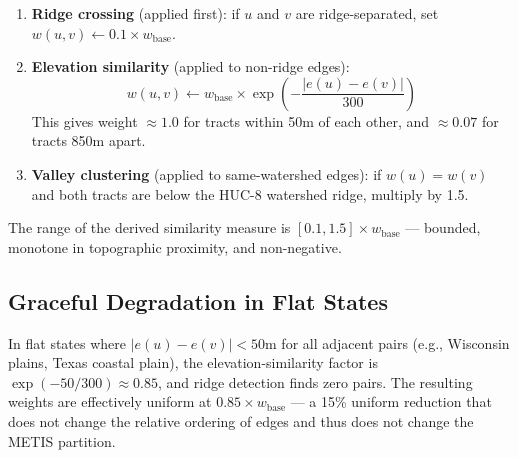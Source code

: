 \begin{enumerate}
  \item \textbf{Ridge crossing} (applied first): if $u$ and $v$ are ridge-separated, set $w(u,v) \leftarrow 0.1 \times w_{\text{base}}$.
  \item \textbf{Elevation similarity} (applied to non-ridge edges):
    \[
      w(u,v) \leftarrow w_{\text{base}} \times \exp\!\left(-\frac{|e(u)-e(v)|}{300}\right)
    \]
    This gives weight $\approx 1.0$ for tracts within 50m of each other, and $\approx 0.07$ for tracts 850m apart.
  \item \textbf{Valley clustering} (applied to same-watershed edges): if $w(u) = w(v)$ and both tracts are below the HUC-8 watershed ridge, multiply by 1.5.
\end{enumerate}

The range of the derived similarity measure is $[0.1, 1.5] \times w_{\text{base}}$ — bounded, monotone in topographic proximity, and non-negative.

\subsection{Graceful Degradation in Flat States}

In flat states where $|e(u)-e(v)| < 50$m for all adjacent pairs (e.g., Wisconsin plains, Texas coastal plain), the elevation-similarity factor is $\exp(-50/300) \approx 0.85$, and ridge detection finds zero pairs. The resulting weights are effectively uniform at $0.85 \times w_{\text{base}}$ — a 15\% uniform reduction that does not change the relative ordering of edges and thus does not change the METIS partition.
